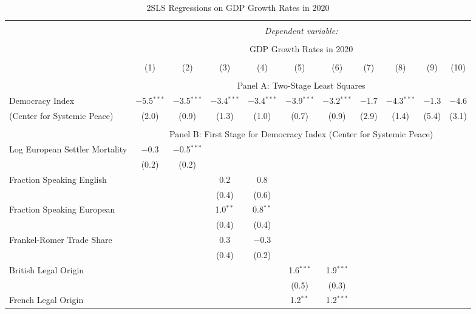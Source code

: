 
\begin{table}[!htbp] 
  \caption{2SLS Regressions on GDP Growth Rates in 2020}
  \label{tab:2sls-gdp-polity} 
  \footnotesize
  \begin{threeparttable}
\begin{tabular}{@{\extracolsep{0pt}}lcccccccccc} 
\\[-1.8ex]\hline 
\hline \\[-1.8ex] 
 & \multicolumn{10}{c}{\textit{Dependent variable:}} \\ 
\cline{2-11} 
\\[-1.8ex] & \multicolumn{10}{c}{GDP Growth Rates in 2020} \\ 
\\[-1.8ex] & (1) & (2) & (3) & (4) & (5) & (6) & (7) & (8) & (9) & (10)\\ 
\hline \\[-1.8ex] 
  & \multicolumn{10}{c}{Panel A: Two-Stage Least Squares} \\
  Democracy Index & $-$5.5$^{***}$ & $-$3.5$^{***}$ & $-$3.4$^{***}$ & $-$3.4$^{***}$ & $-$3.9$^{***}$ & $-$3.2$^{***}$ & $-$1.7 & $-$4.3$^{***}$ & $-$1.3 & $-$4.6 \\ 
  (Center for Systemic Peace) & (2.0) & (0.9) & (1.3) & (1.0) & (0.7) & (0.9) & (2.9) & (1.4) & (5.4) & (3.1) \\ 
 \hline \\[-1.8ex] 
   & \multicolumn{10}{c}{Panel B: First Stage for Democracy Index (Center for Systemic Peace)} \\
 Log European Settler Mortality & $-$0.3 & $-$0.5$^{***}$ &  &  &  &  &  &  &  &  \\ 
  & (0.2) & (0.2) &  &  &  &  &  &  &  &  \\ 
  Fraction Speaking English &  &  & 0.2 & 0.8 &  &  &  &  &  &  \\ 
  &  &  & (0.4) & (0.6) &  &  &  &  &  &  \\ 
  Fraction Speaking European &  &  & 1.0$^{**}$ & 0.8$^{**}$ &  &  &  &  &  &  \\ 
  &  &  & (0.4) & (0.4) &  &  &  &  &  &  \\ 
  Frankel-Romer Trade Share &  &  & 0.3 & $-$0.3 &  &  &  &  &  &  \\ 
  &  &  & (0.4) & (0.2) &  &  &  &  &  &  \\ 
  British Legal Origin &  &  &  &  & 1.6$^{***}$ & 1.9$^{***}$ &  &  &  &  \\ 
  &  &  &  &  & (0.5) & (0.3) &  &  &  &  \\ 
  French Legal Origin &  &  &  &  & 1.2$^{**}$ & 1.2$^{***}$ &  &  &  &  \\ 

\end{tabular}
\end{threeparttable}
\end{table}
